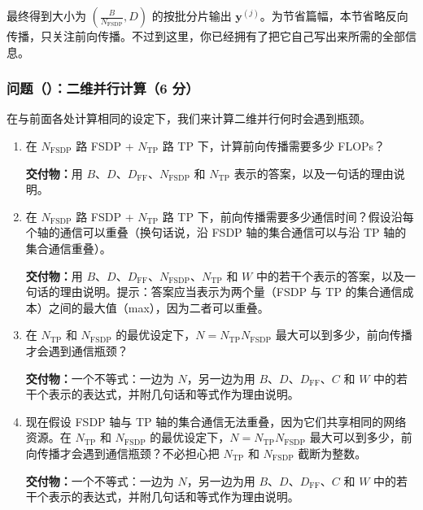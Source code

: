 最终得到大小为 $\left(\frac{B}{N_{\mathrm{FSDP}}},D\right)$ 的按批分片输出 $\boldsymbol{y}^{(j)}$。为节省篇幅，本节省略反向传播，只关注前向传播。不过到这里，你已经拥有了把它自己写出来所需的全部信息。

\subsubsection*{问题（）：二维并行计算（6 分）}

在与前面各处计算相同的设定下，我们来计算二维并行何时会遇到瓶颈。

\begin{enumerate}[label=(\alph*)]
  \item 在 $N_{\mathrm{FSDP}}$ 路 FSDP + $N_{\mathrm{TP}}$ 路 TP 下，计算前向传播需要多少 FLOPs？

  \textbf{交付物：}用 $B$、$D$、$D_{\mathrm{FF}}$、$N_{\mathrm{FSDP}}$ 和 $N_{\mathrm{TP}}$ 表示的答案，以及一句话的理由说明。

  \item 在 $N_{\mathrm{FSDP}}$ 路 FSDP + $N_{\mathrm{TP}}$ 路 TP 下，前向传播需要多少通信时间？假设沿每个轴的通信可以重叠（换句话说，沿 FSDP 轴的集合通信可以与沿 TP 轴的集合通信重叠）。

  \textbf{交付物：}用 $B$、$D$、$D_{\mathrm{FF}}$、$N_{\mathrm{FSDP}}$、$N_{\mathrm{TP}}$ 和 $W$ 中的若干个表示的答案，以及一句话的理由说明。提示：答案应当表示为两个量（FSDP 与 TP 的集合通信成本）之间的最大值（max），因为二者可以重叠。

  \item 在 $N_{\mathrm{TP}}$ 和 $N_{\mathrm{FSDP}}$ 的最优设定下，$N=N_{\mathrm{TP}}N_{\mathrm{FSDP}}$ 最大可以到多少，前向传播才会遇到通信瓶颈？

  \textbf{交付物：}一个不等式：一边为 $N$，另一边为用 $B$、$D$、$D_{\mathrm{FF}}$、$C$ 和 $W$ 中的若干个表示的表达式，并附几句话和等式作为理由说明。

  \item 现在假设 FSDP 轴与 TP 轴的集合通信无法重叠，因为它们共享相同的网络资源。在 $N_{\mathrm{TP}}$ 和 $N_{\mathrm{FSDP}}$ 的最优设定下，$N=N_{\mathrm{TP}}N_{\mathrm{FSDP}}$ 最大可以到多少，前向传播才会遇到通信瓶颈？不必担心把 $N_{\mathrm{TP}}$ 和 $N_{\mathrm{FSDP}}$ 截断为整数。

  \textbf{交付物：}一个不等式：一边为 $N$，另一边为用 $B$、$D$、$D_{\mathrm{FF}}$、$C$ 和 $W$ 中的若干个表示的表达式，并附几句话和等式作为理由说明。
\end{enumerate}

